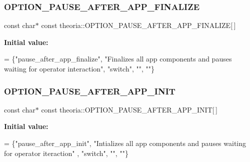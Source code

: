 \subsubsection{\texorpdfstring{O\+P\+T\+I\+O\+N\+\_\+\+P\+A\+U\+S\+E\+\_\+\+A\+F\+T\+E\+R\+\_\+\+A\+P\+P\+\_\+\+F\+I\+N\+A\+L\+I\+ZE}{OPTION\_PAUSE\_AFTER\_APP\_FINALIZE}}
{\footnotesize\ttfamily const char$\ast$ const theoria\+::\+O\+P\+T\+I\+O\+N\+\_\+\+P\+A\+U\+S\+E\+\_\+\+A\+F\+T\+E\+R\+\_\+\+A\+P\+P\+\_\+\+F\+I\+N\+A\+L\+I\+ZE\mbox{[}$\,$\mbox{]}}

{\bfseries Initial value\+:}
\begin{DoxyCode}
= 
        \{\textcolor{stringliteral}{"pause\_after\_app\_finalize"}, \textcolor{stringliteral}{"Finalizes all app components and pauses waiting for operator
       interaction"}, \textcolor{stringliteral}{"switch"}, \textcolor{stringliteral}{""}, \textcolor{stringliteral}{""}\}
\end{DoxyCode}
\mbox{\label{namespacetheoria_a3521632cc98bdc312f3078d5d4fea0d3}} 
\subsubsection{\texorpdfstring{O\+P\+T\+I\+O\+N\+\_\+\+P\+A\+U\+S\+E\+\_\+\+A\+F\+T\+E\+R\+\_\+\+A\+P\+P\+\_\+\+I\+N\+IT}{OPTION\_PAUSE\_AFTER\_APP\_INIT}}
{\footnotesize\ttfamily const char$\ast$ const theoria\+::\+O\+P\+T\+I\+O\+N\+\_\+\+P\+A\+U\+S\+E\+\_\+\+A\+F\+T\+E\+R\+\_\+\+A\+P\+P\+\_\+\+I\+N\+IT\mbox{[}$\,$\mbox{]}}

{\bfseries Initial value\+:}
\begin{DoxyCode}
= 
        \{\textcolor{stringliteral}{"pause\_after\_app\_init"}, \textcolor{stringliteral}{"Intializes all app components and pauses waiting for operator iteraction"}
      , \textcolor{stringliteral}{"switch"}, \textcolor{stringliteral}{""}, \textcolor{stringliteral}{""}\}
\end{DoxyCode}
\mbox{\label{namespacetheoria_ac31be1a3cdbbc6459bd19438ec31ea9e}} 
